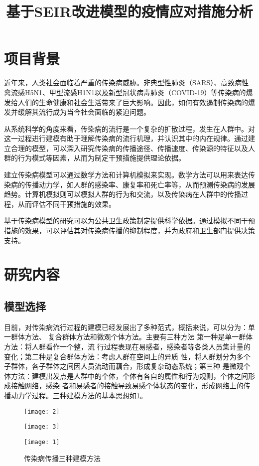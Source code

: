 \documentclass[withoutpreface,bwprint]{cumcmthesis}
\title{基于SEIR改进模型的疫情应对措施分析}
\begin{document}
\maketitle

\section{项目背景}
近年来，人类社会面临着严重的传染病威胁。非典型性肺炎（SARS）、高致病性禽流感H5N1、甲型流感H1N1以及新型冠状病毒肺炎（COVID-19）等传染病的爆发给人们的生命健康和社会生活带来了巨大影响。因此，如何有效遏制传染病的爆发并缓解其流行成为当今社会面临的紧迫问题。

从系统科学的角度来看，传染病的流行是一个复杂的扩散过程，发生在人群中。对这一过程进行建模有助于理解传染病的流行机理，并认识其中的内在规律。通过建立合理的模型，可以深入研究传染病的传播途径、传播速度、传染源的特征以及人群的行为模式等因素，从而为制定干预措施提供理论依据。

建立传染病模型可以通过数学方法和计算机模拟来实现。数学方法可以用来表达传染病的传播动力学，如人群的感染率、康复率和死亡率等，从而预测传染病的发展趋势。计算机模拟则可以模拟人群的行为和交流，以及传染病在人群中的传播过程，从而评估不同干预措施的效果。

基于传染病模型的研究可以为公共卫生政策制定提供科学依据。通过模拟不同干预措施的效果，可以评估其对传染病传播的抑制程度，并为政府和卫生部门提供决策支持。
\section{研究内容}
\subsection{模型选择}
目前，对传染病流行过程的建模已经发展出了多种范式，概括来说，可以分为：单一群体方法、
复合群体方法和微观个体方法。主要有三种方法 第一种是单一群体方法：将人群看作一个整，流
行过程表现在易感者，感染者等各类人员集计量的变化；第二种是复合群体方法：考虑人群在空间上的异质
性，将人群划分为多个子群体，各子群体之间因人员流动而藕合，形成复杂动态系统；第三种
是微观个体方法：建模出发点是人群中的个体，个体有各自的属性和行为规则，个体之间形成接触网络，感染
者和易感者的接触导致易感个体状态的变化，形成网络上的传播动力学过程。三种建模方法的基本思想如\cref{fig:1}。
\begin{figure}[H]
    \centering
    \begin{minipage}[c]{0.3\textwidth}
        \centering
        \texttt{[image: 2]}
        \label{fig:1.1}
    \end{minipage}
    \begin{minipage}[c]{0.3\textwidth}
        \centering
        \texttt{[image: 3]}
        \label{fig:1.2}
    \end{minipage}
    \begin{minipage}[c]{0.3\textwidth}
        \centering
        \texttt{[image: 1]}
        \label{fig:1.3}
    \end{minipage}
    \caption{传染病传播三种建模方法}
    \label{fig:1}
\end{figure}
\end{document}
